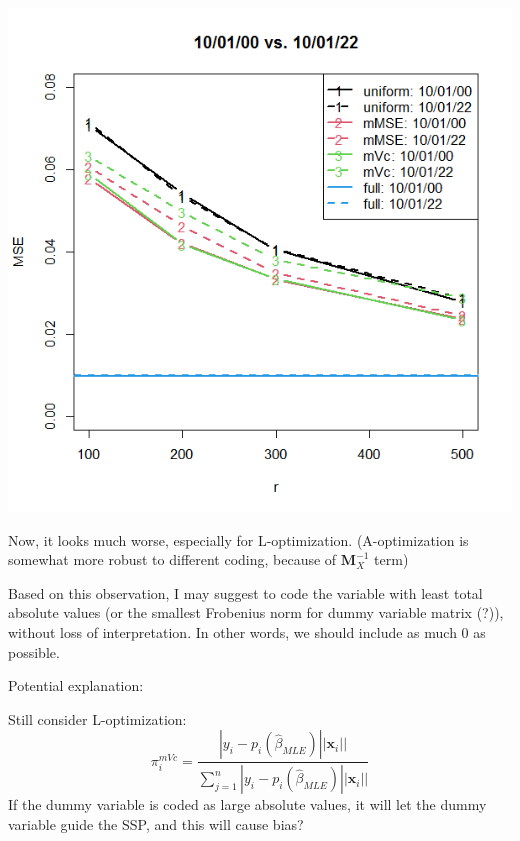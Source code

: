 \documentclass[]{article}
\begin{document}
\includegraphics[width = .8\textwidth]{plot_2levels_2.png}

Now, it looks much worse, especially for L-optimization. (A-optimization is somewhat more robust to different coding, because of $\boldsymbol{M}_{X}^{-1}$ term)

Based on this observation, I may suggest to code the variable with least total absolute values (or the smallest Frobenius norm for dummy variable matrix (?)), without loss of interpretation. In other words, we should include as much 0 as possible.


Potential explanation:

Still consider L-optimization:
\begin{equation*}
	\pi_{i}^{mVc} = \frac{|y_i-p_i(\hat{\beta}_{MLE})||\boldsymbol{x}_i||}{\sum_{j=1}^{n}|y_i-p_i(\hat{\beta}_{MLE})||\boldsymbol{x}_i||}
\end{equation*}
If the dummy variable is coded as large absolute values, it will let the dummy variable guide the SSP, and this will cause bias?

	
\end{document}
